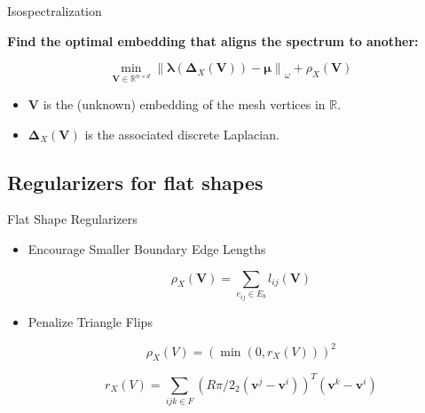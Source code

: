 \documentclass{beamer}
\begin{document}
\begin{frame}{Isospectralization}

\textbf{Find the optimal embedding that aligns the spectrum to another:}

 $$ \min _{\mathbf{V} \in \mathbb{R}^{n \times d}}\left\|\boldsymbol{\lambda}\left(\boldsymbol{\Delta}_{X}(\mathbf{V})\right)-\boldsymbol{\mu}\right\|_{\omega}+\rho_{X}(\mathbf{V}) $$

\vskip 0.5cm

    \begin{itemize}
        \item $\mathbf{V}$ is the (unknown) embedding of the mesh vertices in $\mathbb{R}$.
        \item $\boldsymbol{\Delta}_{X}(\mathbf{V})$ is the associated discrete Laplacian.
    \end{itemize}
    
\end{frame}


\subsection{Regularizers for flat shapes}

\begin{frame}{Flat Shape Regularizers}

\begin{itemize}
    \item Encourage Smaller Boundary Edge Lengths
    
    $$ \rho_{X}(\mathbf{V}) = \sum_{e_{ij} \in E_{b}} l_{ij}(\mathbf{V}) $$
    
    \item Penalize Triangle Flips
    
    $$\rho_{X}(V)=\left(\min \left(0, r_{X}(V)\right)\right)^{2}$$
    
   $$r_{X}(V)=\sum_{i j k \in F}\left(R \pi / 2_{2}\left(\mathbf{v}^{j}-\mathbf{v}^{i}\right)\right)^{T}\left(\mathbf{v}^{k}-\mathbf{v}^{i}\right)$$

    
\end{itemize}
    
\end{frame}
\end{document}

